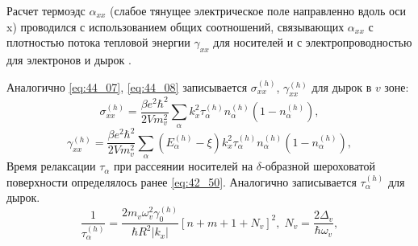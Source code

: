 Расчет термоэдс $\alpha_{xx} $ (слабое тянущее электрическое поле направленно вдоль оси x) проводился с использованием общих соотношений, связывающих $\alpha_{xx} $ с плотностью потока тепловой энергии $\gamma_{xx} $ для носителей и с электропроводностью для электронов и дырок \cite{Kubo1957}.

Аналогично \eqref{eq:44_07}, \eqref{eq:44_08} записывается $\sigma_{xx}^{(h)} $, $\gamma_{xx}^{(h)} $ для дырок в $v$ зоне:
\begin{equation} \label{eq:44_31_01}
	\sigma_{xx}^{(h)} =\frac{\beta e^2 \hbar^2 }{2V m_v^2 } \sum_{\alpha }k_x^2 \tau_{\alpha }^{(h)} n^{(h)}_{\alpha } \left(1-n^{(h)}_{\alpha } \right),
\end{equation}
\begin{equation} \label{eq:44_31}
	\gamma_{xx}^{(h)} =\frac{\beta e^2 \hbar^2 }{2 V m_v^2 } \sum _{\alpha }\left(E_{\alpha }^{(h)} -\xi \right)k_x^2 \tau _{\alpha }^{(h)} n^{(h)}_{\alpha } \left(1-n^{(h)}_{\alpha } \right) ,
\end{equation}
Время релаксации $\tau_\alpha $ при рассеянии носителей на $\delta $-образной шероховатой поверхности определялось ранее \eqref{eq:42_50}. Аналогично записывается $\tau_{\alpha }^{(h)} $ для дырок.
\begin{equation} \label{eq:44_40}
	\frac{1}{\tau_{\alpha }^{(h)} } =\frac{2m_v \omega_v^2 \gamma_0^{(h)} }{\hbar R^2 \left| k_x \right|} \left[n+m+1+N_v \right]^2, \; N_v =\frac{2 \Delta_v }{\hbar \omega_v} ,
\end{equation}

